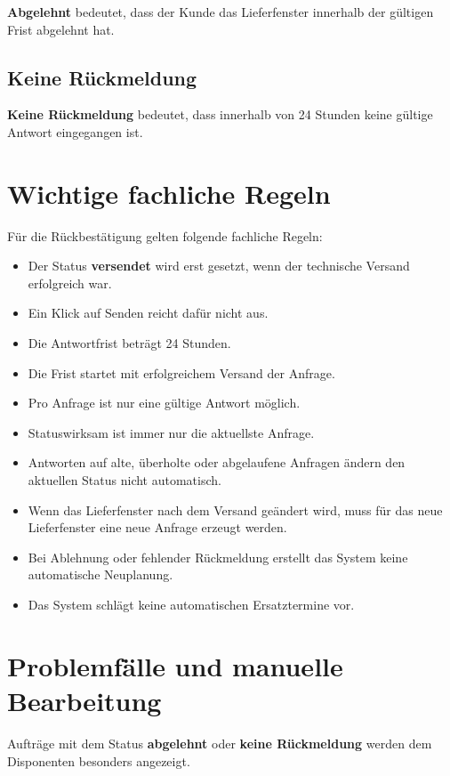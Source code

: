 \documentclass[12pt,a4paper]{article}
\begin{document}
	\textbf{Abgelehnt} bedeutet, dass der Kunde das Lieferfenster innerhalb der gültigen Frist abgelehnt hat.
	
	\subsection{Keine Rückmeldung}
	
	\textbf{Keine Rückmeldung} bedeutet, dass innerhalb von 24 Stunden keine gültige Antwort eingegangen ist.
	
	\section{Wichtige fachliche Regeln}
	
	Für die Rückbestätigung gelten folgende fachliche Regeln:
	
	\begin{itemize}
		\item Der Status \textbf{versendet} wird erst gesetzt, wenn der technische Versand erfolgreich war.
		\item Ein Klick auf \glqq Senden\grqq{} reicht dafür nicht aus.
		\item Die Antwortfrist beträgt 24 Stunden.
		\item Die Frist startet mit erfolgreichem Versand der Anfrage.
		\item Pro Anfrage ist nur eine gültige Antwort möglich.
		\item Statuswirksam ist immer nur die aktuellste Anfrage.
		\item Antworten auf alte, überholte oder abgelaufene Anfragen ändern den aktuellen Status nicht automatisch.
		\item Wenn das Lieferfenster nach dem Versand geändert wird, muss für das neue Lieferfenster eine neue Anfrage erzeugt werden.
		\item Bei Ablehnung oder fehlender Rückmeldung erstellt das System keine automatische Neuplanung.
		\item Das System schlägt keine automatischen Ersatztermine vor.
	\end{itemize}
	
	\section{Problemfälle und manuelle Bearbeitung}
	
	Aufträge mit dem Status \textbf{abgelehnt} oder \textbf{keine Rückmeldung} werden dem Disponenten besonders angezeigt.
	
\end{document}

